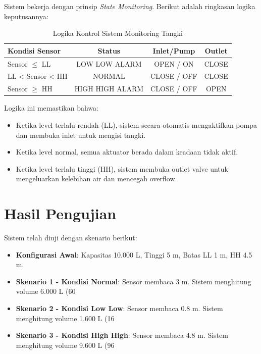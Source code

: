 \documentclass[12pt,a4paper]{article}
\begin{document}
Sistem bekerja dengan prinsip \textit{State Monitoring}. Berikut adalah ringkasan logika keputusannya:

\begin{table}[h]
\centering
\caption{Logika Kontrol Sistem Monitoring Tangki}
\begin{tabular}{|l|c|c|c|}
\hline
\textbf{Kondisi Sensor} & \textbf{Status} & \textbf{Inlet/Pump} & \textbf{Outlet} \\ \hline
Sensor $\leq$ LL & LOW LOW ALARM & OPEN / ON & CLOSE \\ \hline
LL < Sensor < HH & NORMAL & CLOSE / OFF & CLOSE \\ \hline
Sensor $\geq$ HH & HIGH HIGH ALARM & CLOSE / OFF & OPEN \\ \hline
\end{tabular}
\end{table}

Logika ini memastikan bahwa:
\begin{itemize}
    \item Ketika level terlalu rendah (LL), sistem secara otomatis mengaktifkan pompa dan membuka inlet untuk mengisi tangki.
    \item Ketika level normal, semua aktuator berada dalam keadaan tidak aktif.
    \item Ketika level terlalu tinggi (HH), sistem membuka outlet valve untuk mengeluarkan kelebihan air dan mencegah overflow.
\end{itemize}

\section{Hasil Pengujian}

Sistem telah diuji dengan skenario berikut:
\begin{itemize}
    \item \textbf{Konfigurasi Awal}: Kapasitas 10.000 L, Tinggi 5 m, Batas LL 1 m, HH 4.5 m.
    
    \item \textbf{Skenario 1 - Kondisi Normal}: Sensor membaca 3 m. Sistem menghitung volume 6.000 L (60%
    
    \item \textbf{Skenario 2 - Kondisi Low Low}: Sensor membaca 0.8 m. Sistem menghitung volume 1.600 L (16%
    
    \item \textbf{Skenario 3 - Kondisi High High}: Sensor membaca 4.8 m. Sistem menghitung volume 9.600 L (96%
\end{itemize}
\end{document}
